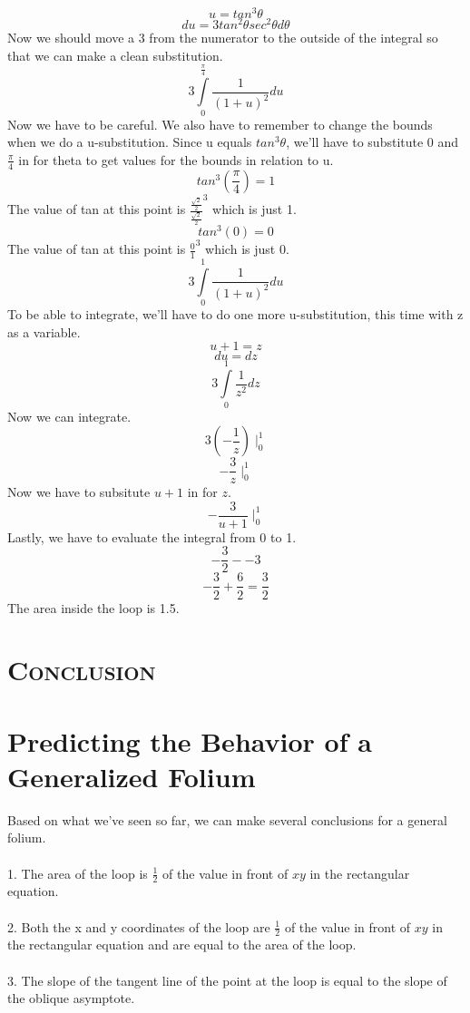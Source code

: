 \documentclass[a4paper,openright, 10pt]{article}
\newcommand{\ssection}[1]{%
\section[#1]{\centering\normalfont\scshape #1}}
\begin{document}
$$u=tan^3\theta$$
$$du=3tan^2\theta sec^2\theta d\theta$$
Now we should move a 3 from the numerator to the outside of the integral so that we can make a clean substitution.
$$3\int\limits_{0}^{\frac{\pi}{4}}\frac{1}{(1+u)^2}du$$
Now we have to be careful. We also have to remember to change the bounds when we do a u-substitution. Since u equals $tan^3\theta$, we'll have to substitute 0 and $\frac{\pi}{4}$ in for theta to get values for the bounds in relation to u.
$$tan^3(\frac{\pi}{4})=1$$
The value of tan at this point is $\frac{\frac{\sqrt{2}}{2}}{\frac{\sqrt{2}}{2}}^3$ which is just 1.
$$tan^3(0)=0$$
The value of tan at this point is $\frac{0}{1}^3$ which is just 0.
$$3\int\limits_{0}^{1}\frac{1}{(1+u)^2}du$$
To be able to integrate, we'll have to do one more u-substitution, this time with z as a variable.
$$u+1=z$$
$$du=dz$$
$$3\int\limits_{0}^{1}\frac{1}{z^2}dz$$
Now we can integrate.
$$3(-\frac{1}{z})\mid_{0}^{1}$$
$$-\frac{3}{z}\mid_{0}^{1}$$
Now we have to subsitute $u+1$ in for $z$.
$$-\frac{3}{u+1}\mid_{0}^{1}$$
Lastly, we have to evaluate the integral from 0 to 1.
$$-\frac{3}{2}--3$$
$$-\frac{3}{2}+\frac{6}{2}=\frac{3}{2}$$
The area inside the loop is 1.5.
\ssection{Conclusion}
\section*{Predicting the Behavior of a Generalized Folium}
Based on what we've seen so far, we can make several conclusions for a general folium.\\\\
1. The area of the loop is $\frac{1}{2}$ of the value in front of $xy$ in the rectangular equation.\\\\
2. Both the x and y coordinates of the loop are $\frac{1}{2}$ of the value in front of $xy$ in the rectangular equation and are equal to the area of the loop.\\\\
3. The slope of the tangent line of the point at the loop is equal to the slope of the oblique asymptote.
\end{document}
